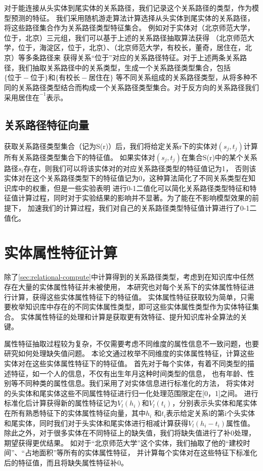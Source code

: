 对于能连接从头实体到尾实体的关系路径，我们记录这个关系路径的类型，作为模型预测的特征。
我们采用随机游走算法\cite{Lovsz1993RandomWO}计算选择从头实体到尾实体的关系路径，将这些路径集合作为关系路径类型特征集合。
例如对于实体对（北京师范大学，位于，北京）三元组，我们可以基于上述的关系路径抽取算法获得
（北京师范大学，位于，海淀区，位于，北京）、（北京师范大学，有校长，董奇，居住在，北京）等多条路径来
获得关系“位于”对应的关系路径特征。对于上述两条关系路径，我们抽取关系路径中的关系类型，生成一个关系路径类型集合，包括$\{位于 -位于\}$和$\{有校长-居住在\}$
等不同关系组成的关系路径类型，从将多种不同的关系路径类型结合而构成一个关系路径类型集合。对于反方向的关系路径我们采用${居住在}^{-1}$表示。

\subsection{关系路径特征向量}
获取关系路径类型集合（记为S(r)）后，我们将给定关系r下的实体对$(s_j,t_j)$计算所有关系路径类型集合下的特征值。
如果实体对$(s_j,t_j)$在集合S(r)中的某个关系路径$s_i$存在，则我们可以将该实体对的对应关系路径类型的特征值记为1，
否则该实体对在这个关系路径类型下的特征值记为0，这种算法简化了不同关系类型在知识库中的权重，但是一些实验表明\cite{Gardner2014}
进行0-1二值化可以简化关系路径类型特征和特征值计算过程，同时对于实验结果的影响并不显著。为了能在不影响模型效果的前提下，
加速我们的计算过程，我们对自己的关系路径类型特征值计算进行了0-1二值化。

\section{实体属性特征计算}
\label{sec:literal-compute}
除了\ref{sec:relational-compute}中计算得到的关系路径类型，考虑到在知识库中任然存在大量的实体属性特征并未被使用，
本研究也对每个关系下的实体属性特征进行计算，获得这些实体属性特征下的特征值。
实体属性特征获取较为简单，只需要枚举知识库中存在的不同实体属性类型，即可这些实体属性类型作为实体特征集合。
实体属性特征的处理和计算是获取更有效特征、提升知识库补全算法的关键。

属性特征抽取过程较为复杂，不仅需要考虑不同维度的属性信息不一致问题，也要研究如何处理缺失值问题。
本论文通过枚举不同维度的实体属性特征，计算这些实体对在这些实体属性特征下的特征值。
首先对于每个实体，有着不同类型的描述特征，如一个人的信息，不仅有出生年月这种时间类型的信息，
也有年龄、性别等不同种类的属性信息。我们采用了对实体信息进行标准化的方法，
将实体对的头实体和尾实体这些不同属性特征进行归一化处理范围限定在[0，1]之间。
进行标准化后计算获得新的属性特征记为$V_l(h_i)$和$V_l (t_i)$，分别表示头实体和尾实体在所有熟悉特征下的实体属性特征向量，其中$h_i$ 和$t_i$表示给定关系l的第i个头实体和尾实体，同时我们对于头实体和尾实体进行相减计算获得$V_l(h_i-t_i )$属性值。除此之外，对于很多实体在不同特征上的缺失值，我们将缺失值进行了补0处理，期望获得更优结果。
如对于“北京师范大学”这个实体，我们抽取了他的“建校时间”、“占地面积”等所有的实体属性特征，
并计算每个实体对在这些特征下标准化后的特征值，而且将缺失属性特征补0。

